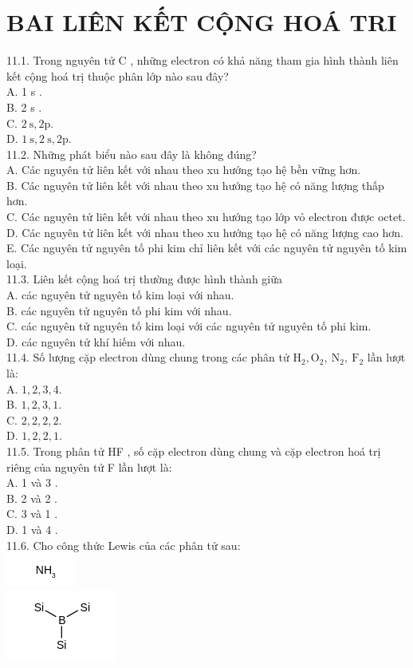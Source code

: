 \documentclass[10pt]{article}
\begin{document}
\section*{BAI LIÊN KẾT CỘNG HOÁ TRI}
11.1. Trong nguyên tử C , những electron có khả năng tham gia hình thành liên kết cộng hoá trị thuộc phân lớp nào sau đây?\\
A. 1 s .\\
B. 2 s .\\
C. $2 \mathrm{~s}, 2 \mathrm{p}$.\\
D. $1 \mathrm{~s}, 2 \mathrm{~s}, 2 \mathrm{p}$.\\
11.2. Những phát biểu nào sau đây là không đúng?\\
A. Các nguyên tử liên kết với nhau theo xu hướng tạo hệ bền vững hơn.\\
B. Các nguyên tử liên kết với nhau theo xu hướng tạo hệ có năng lượng thấp hơn.\\
C. Các nguyên tử liên kết với nhau theo xu hướng tạo lớp vỏ electron được octet.\\
D. Các nguyên tử liên kết với nhau theo xu hướng tạo hệ có năng lượng cao hơn.\\
E. Các nguyên tử nguyên tố phi kim chỉ liên kết với các nguyên tử nguyên tố kim loại.\\
11.3. Liên kết cộng hoá trị thường được hình thành giữa\\
A. các nguyên tử nguyên tố kim loại với nhau.\\
B. các nguyên tử nguyên tố phi kim với nhau.\\
C. các nguyên tử nguyên tố kim loại với các nguyên tử nguyên tố phi kim.\\
D. các nguyên tử khí hiếm với nhau.\\
11.4. Số lượng cặp electron dùng chung trong các phân tử $\mathrm{H}_{2}, \mathrm{O}_{2}, \mathrm{~N}_{2}, \mathrm{~F}_{2}$ lần lượt là:\\
A. $1,2,3,4$.\\
B. $1,2,3,1$.\\
C. $2,2,2,2$.\\
D. $1,2,2,1$.\\
11.5. Trong phân tử HF , số cặp electron dùng chung và cặp electron hoá trị riêng của nguyên tử F lần lượt là:\\
A. 1 và 3 .\\
B. 2 và 2 .\\
C. 3 và 1 .\\
D. 1 và 4 .\\
11.6. Cho công thức Lewis của các phân tử sau:\\
\includegraphics{smile-323b34a12f0c69f2883133db7029f44d8a3f4991}\\
\includegraphics{smile-05655845563762e28f678febc1bb282277f475c1}
\end{document}
